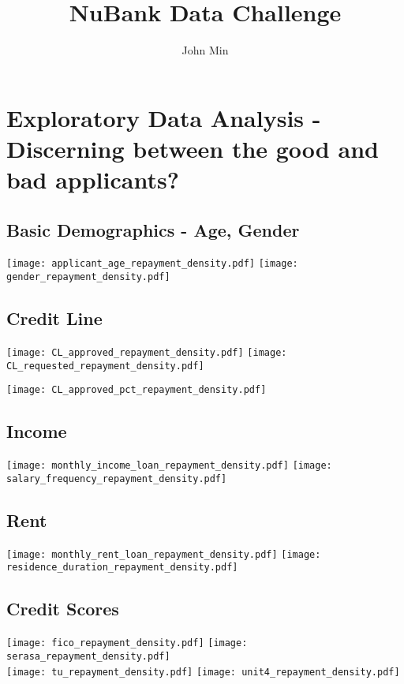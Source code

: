 \documentclass[a4paper, landscape]{article}
\begin{document}
\title{NuBank Data Challenge}

\author{John Min}
\maketitle

\tableofcontents

\graphicspath{ {/home/lj/ML/NuBank/Plots/} }

\newpage

\section{Exploratory Data Analysis - Discerning between the good and bad applicants?}

\subsection{Basic Demographics - Age, Gender}
\texttt{[image: applicant\_age\_repayment\_density.pdf]}
\texttt{[image: gender\_repayment\_density.pdf]}

\subsection{Credit Line}
\texttt{[image: CL\_approved\_repayment\_density.pdf]}
\texttt{[image: CL\_requested\_repayment\_density.pdf]}

\centerline{\texttt{[image: CL\_approved\_pct\_repayment\_density.pdf]}
}

\newpage

\subsection{Income}

\texttt{[image: monthly\_income\_loan\_repayment\_density.pdf]}
\texttt{[image: salary\_frequency\_repayment\_density.pdf]}

\newpage
\subsection{Rent}

\texttt{[image: monthly\_rent\_loan\_repayment\_density.pdf]}
\texttt{[image: residence\_duration\_repayment\_density.pdf]}

\newpage
\subsection*{Credit Scores}
\texttt{[image: fico\_repayment\_density.pdf]}
\texttt{[image: serasa\_repayment\_density.pdf]} \\
\texttt{[image: tu\_repayment\_density.pdf]}
\texttt{[image: unit4\_repayment\_density.pdf]}
\end{document}
